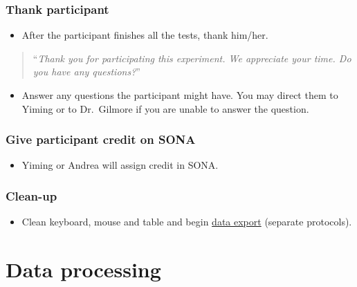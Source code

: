 \documentclass[]{article}
\providecommand{\tightlist}{%
  \setlength{\itemsep}{0pt}\setlength{\parskip}{0pt}}
\begin{document}
\hypertarget{thank-participant}{%
\subsubsection{Thank participant}\label{thank-participant}}

\begin{itemize}
\tightlist
\item
  After the participant finishes all the tests, thank him/her.
\end{itemize}

\begin{quote}
``\emph{Thank you for participating this experiment. We appreciate your
time. Do you have any questions?}''
\end{quote}

\begin{itemize}
\tightlist
\item
  Answer any questions the participant might have. You may direct them
  to Yiming or to Dr.~Gilmore if you are unable to answer the question.
\end{itemize}

\hypertarget{give-participant-credit-on-sona}{%
\subsubsection{Give participant credit on
SONA}\label{give-participant-credit-on-sona}}

\begin{itemize}
\tightlist
\item
  Yiming or Andrea will assign credit in SONA.
\end{itemize}

\hypertarget{clean-up}{%
\subsubsection{Clean-up}\label{clean-up}}

\begin{itemize}
\tightlist
\item
  Clean keyboard, mouse and table and begin
  \href{sex-differences-data-export.md}{data export} (separate
  protocols).
\end{itemize}

\hypertarget{data-processing}{%
\section{Data processing}\label{data-processing}}
\end{document}
